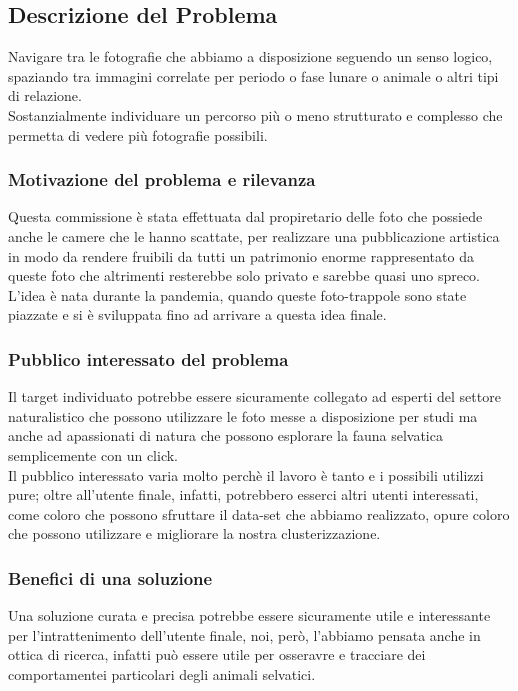 \documentclass[12pt,a4paper,twoside]{article}
\begin{document}
\subsection*{Descrizione del Problema}
Navigare tra le fotografie che abbiamo a disposizione seguendo un senso logico, spaziando tra immagini 
correlate per periodo o fase lunare o animale o altri tipi di relazione.\\
Sostanzialmente individuare un percorso più o meno strutturato e complesso che permetta di vedere più 
fotografie possibili.
\subsubsection*{Motivazione del problema e rilevanza}
Questa commissione è stata effettuata dal propiretario delle foto che possiede anche le camere che le hanno
scattate, per realizzare una pubblicazione artistica in modo da rendere fruibili da tutti un patrimonio 
enorme rappresentato da queste foto che altrimenti resterebbe solo privato e sarebbe quasi uno spreco.\\
L'idea è nata durante la pandemia, quando queste foto-trappole sono state piazzate e si è sviluppata fino ad 
arrivare a questa idea finale.
\subsubsection*{Pubblico interessato del problema}
Il target individuato potrebbe essere sicuramente collegato ad esperti del settore naturalistico che possono 
utilizzare le foto messe a disposizione per studi ma anche ad apassionati di natura che possono esplorare 
la fauna selvatica semplicemente con un click.\\
Il pubblico interessato varia molto perchè il lavoro è tanto e i possibili utilizzi pure; oltre all'utente 
finale, infatti, potrebbero esserci altri utenti interessati, come coloro che possono sfruttare il data-set 
che abbiamo realizzato, opure coloro che possono utilizzare e migliorare la nostra clusterizzazione.
\subsubsection*{Benefici di una soluzione}
Una soluzione curata e precisa potrebbe essere sicuramente utile e interessante per l'intrattenimento 
dell'utente finale, noi, però, l'abbiamo pensata anche in ottica di ricerca, infatti può essere utile per 
osseravre e tracciare dei comportamentei particolari degli animali selvatici.
\end{document}
